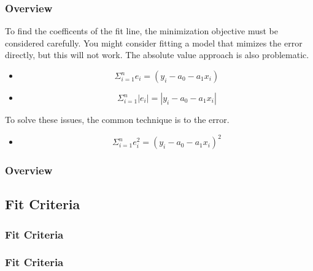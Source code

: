 \documentclass[fleqn]{beamer} %
\newcommand{\sectionIIsubsectionItitle}{Overview}
\newcommand{\sectionIIsubsectionIItitle}{Fit Criteria}
\begin{document}
			\begin{frame}[label=sectionIIsubsectionI]
				\frametitle{\sectionIIsubsectionItitle}
				\bigskip

        To find the coefficents of the fit line, the minimization objective must be considered carefully. You might consider fitting a model that mimizes the error directly, but this will not work. The absolute value approach is also problematic.

          \begin{itemize}
            \item \[\Sigma_{i=1}^n e_i = \left(y_i-a_0-a_1x_i\right)\] \vspace{3mm}
            \item \[\Sigma_{i=1}^n |e_i| = \left|y_i-a_0-a_1x_i\right|\] \vspace{3mm}
          \end{itemize}
      
 To solve these issues, the common technique is to \underline{\hspace{25mm}} the error.
          \begin{itemize}
             \item \[\Sigma_{i=1}^n e_i^2 = \left(y_i-a_0-a_1x_i\right)^2\] \vspace{3mm}
          \end{itemize}

				\btVFill
			\end{frame}	

			\begin{frame}[label=sectionIIsubsectionI]
				\frametitle{\sectionIIsubsectionItitle}
				\bigskip

				
				\btVFill
			\end{frame}

		\subsection{\sectionIIsubsectionIItitle}\label{sectionIIsubsectionII}

			\begin{frame}
				\frametitle{\sectionIIsubsectionIItitle} \small
				\bigskip

        

				\btVFill 
			\end{frame}	

			\begin{frame}
				\frametitle{\sectionIIsubsectionIItitle} \small
				\bigskip


				\btVFill
			\end{frame}		
\end{document}

